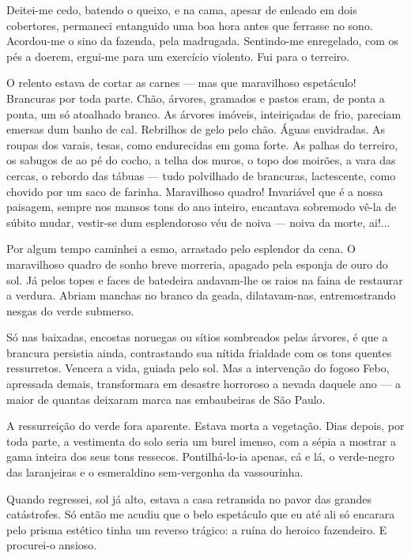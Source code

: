 Deitei-me cedo, batendo o queixo, e na cama, apesar de enleado em dois
cobertores, permaneci entanguido uma boa hora antes que ferrasse no
sono. Acordou-me o sino da fazenda, pela madrugada. Sentindo-me
enregelado, com os pés a doerem, ergui-me para um exercício violento.
Fui para o terreiro.

O relento estava de cortar as carnes --- mas que maravilhoso espetáculo!
Brancuras por toda parte. Chão, árvores, gramados e pastos eram, de
ponta a ponta, um só atoalhado branco. As árvores imóveis, inteiriçadas
de frio, pareciam emersas dum banho de cal. Rebrilhos de gelo pelo chão.
Águas envidradas. As roupas dos varais, tesas, como endurecidas em goma
forte. As palhas do terreiro, os sabugos de ao pé do cocho, a telha dos
muros, o topo dos moirões, a vara das cercas, o rebordo das tábuas ---
tudo polvilhado de brancuras, lactescente, como chovido por um saco de
farinha. Maravilhoso quadro! Invariável que é a nossa paisagem, sempre
nos mansos tons do ano inteiro, encantava sobremodo vê-la de súbito
mudar, vestir-se dum esplendoroso véu de noiva --- noiva da morte,
ai!...

Por algum tempo caminhei a esmo, arrastado pelo esplendor da cena. O
maravilhoso quadro de sonho breve morreria, apagado pela esponja de ouro
do sol. Já pelos topes e faces de batedeira andavam-lhe os raios na
faina de restaurar a verdura. Abriam manchas no branco da geada,
dilatavam-nas, entremostrando nesgas do verde submerso.

Só nas baixadas, encostas noruegas ou sítios sombreados pelas árvores, é
que a brancura persistia ainda, contrastando sua nítida frialdade com os
tons quentes ressurretos. Vencera a vida, guiada pelo sol. Mas a
intervenção do fogoso Febo, apressada demais, transformara em desastre
horroroso a nevada daquele ano --- a maior de quantas deixaram marca nas
embaubeiras de São Paulo.

A ressurreição do verde fora aparente. Estava morta a vegetação. Dias
depois, por toda parte, a vestimenta do solo seria um burel imenso, com
a sépia a mostrar a gama inteira dos seus tons ressecos. Pontilhá-lo-ia
apenas, cá e lá, o verde-negro das laranjeiras e o esmeraldino
sem-vergonha da vassourinha.

Quando regressei, sol já alto, estava a casa retransida no pavor das
grandes catástrofes. Só então me acudiu que o belo espetáculo que eu até
ali só encarara pelo prisma estético tinha um reverso trágico: a ruína
do heroico fazendeiro. E procurei-o ansioso.

